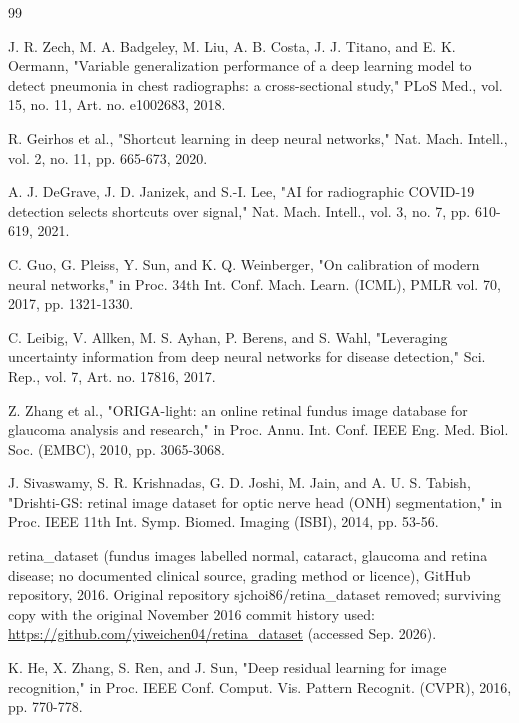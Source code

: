 \documentclass[conference,a4paper]{IEEEtran}
\begin{document}
\begin{thebibliography}{99}

J. R. Zech, M. A. Badgeley, M. Liu, A. B. Costa, J. J. Titano, and E. K. Oermann, "Variable
generalization performance of a deep learning model to detect pneumonia in chest radiographs: a
cross-sectional study," PLoS Med., vol. 15, no. 11, Art. no. e1002683, 2018.


R. Geirhos et al., "Shortcut learning in deep neural networks," Nat. Mach. Intell., vol. 2, no. 11,
pp. 665-673, 2020.


A. J. DeGrave, J. D. Janizek, and S.-I. Lee, "AI for radiographic COVID-19 detection selects
shortcuts over signal," Nat. Mach. Intell., vol. 3, no. 7, pp. 610-619, 2021.


C. Guo, G. Pleiss, Y. Sun, and K. Q. Weinberger, "On calibration of modern neural networks," in
Proc. 34th Int. Conf. Mach. Learn. (ICML), PMLR vol. 70, 2017, pp. 1321-1330.


C. Leibig, V. Allken, M. S. Ayhan, P. Berens, and S. Wahl, "Leveraging uncertainty information from
deep neural networks for disease detection," Sci. Rep., vol. 7, Art. no. 17816, 2017.


Z. Zhang et al., "ORIGA-light: an online retinal fundus image database for glaucoma analysis and
research," in Proc. Annu. Int. Conf. IEEE Eng. Med. Biol. Soc. (EMBC), 2010, pp. 3065-3068.


J. Sivaswamy, S. R. Krishnadas, G. D. Joshi, M. Jain, and A. U. S. Tabish, "Drishti-GS: retinal
image dataset for optic nerve head (ONH) segmentation," in Proc. IEEE 11th Int. Symp. Biomed.
Imaging (ISBI), 2014, pp. 53-56.


retina\_dataset (fundus images labelled normal, cataract, glaucoma and retina disease; no documented
clinical source, grading method or licence), GitHub repository, 2016. Original repository
sjchoi86/retina\_dataset removed; surviving copy with the original November 2016 commit history
used: \url{https://github.com/yiweichen04/retina_dataset} (accessed Sep. 2026).


K. He, X. Zhang, S. Ren, and J. Sun, "Deep residual learning for image recognition," in Proc. IEEE
Conf. Comput. Vis. Pattern Recognit. (CVPR), 2016, pp. 770-778.


\end{thebibliography}
\end{document}
